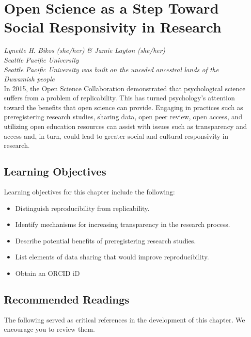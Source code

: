 \documentclass[
  11pt,
]{book}
\providecommand{\tightlist}{%
  \setlength{\itemsep}{0pt}\setlength{\parskip}{0pt}}
\begin{document}
\hypertarget{OpSci}{%
\chapter{Open Science as a Step Toward Social Responsivity in Research}\label{OpSci}}

\emph{Lynette H. Bikos (she/her) \& Jamie Layton (she/her)}\\
\emph{Seattle Pacific University}\\
\emph{Seattle Pacific University was built on the unceded ancestral lands of the Duwamish people}\\

In 2015, the Open Science Collaboration demonstrated that psychological science suffers from a problem of replicability. This has turned psychology's attention toward the benefits that open science can provide. Engaging in practices such as preregistering research studies, sharing data, open peer review, open access, and utilizing open education resources can assist with issues such as transparency and access and, in turn, could lead to greater social and cultural responsivity in research.

\hypertarget{learning-objectives-1}{%
\section{Learning Objectives}\label{learning-objectives-1}}

Learning objectives for this chapter include the following:

\begin{itemize}
\tightlist
\item
  Distinguish reproducibility from replicability.
\item
  Identify mechanisms for increasing transparency in the research process.
\item
  Describe potential benefits of preregistering research studies.
\item
  List elements of data sharing that would improve reproducibility.
\item
  Obtain an ORCID iD
\end{itemize}

\hypertarget{recommended-readings}{%
\section{Recommended Readings}\label{recommended-readings}}

The following served as critical references in the development of this chapter. We encourage you to review them.
\end{document}
